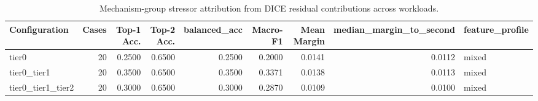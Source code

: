 \begin{table}[t]
\centering
\caption{Mechanism-group stressor attribution from DICE residual contributions across workloads.}
\label{tab:dice_stressor_diagnosis}
\footnotesize
\begin{tabular}{lrrrrrrrl}
\toprule
Configuration & Cases & Top-1 Acc. & Top-2 Acc. & balanced_acc & Macro-F1 & Mean Margin & median_margin_to_second & feature_profile \\
\midrule
tier0 & 20 & 0.2500 & 0.6500 & 0.2500 & 0.2000 & 0.0141 & 0.0112 & mixed \\
tier0_tier1 & 20 & 0.3500 & 0.6500 & 0.3500 & 0.3371 & 0.0138 & 0.0113 & mixed \\
tier0_tier1_tier2 & 20 & 0.3000 & 0.6500 & 0.3000 & 0.2870 & 0.0109 & 0.0100 & mixed \\
\bottomrule
\end{tabular}

\end{table}
